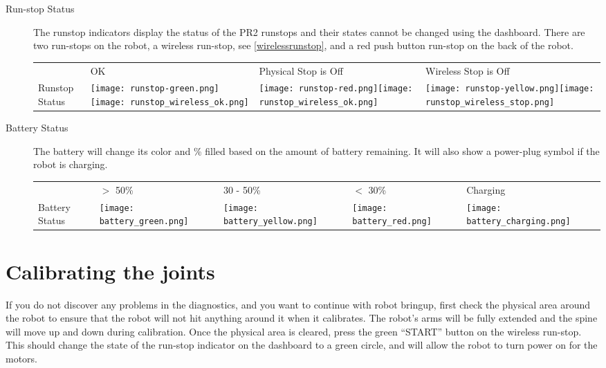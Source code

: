 \begin{description}
\item[Run-stop Status] The runstop indicators display the status of the PR2 runstops and their states cannot be changed using the dashboard. 
There are two run-stops on the robot, a wireless run-stop, see \ref{wirelessrunstop}, and a red push button run-stop on the back of the robot.\\

    \begin{tabular}{m{2.6cm}SSS}
     & OK & Physical Stop is Off & Wireless Stop is Off\\
    Runstop Status & \texttt{[image: runstop-green.png]}\texttt{[image: runstop\_wireless\_ok.png]}&
                     \texttt{[image: runstop-red.png]}\texttt{[image: runstop\_wireless\_ok.png]}&
                     \texttt{[image: runstop-yellow.png]}\texttt{[image: runstop\_wireless\_stop.png]}\\
   \end{tabular}

\item[Battery Status]
The battery will change its color and \% filled based on the amount of battery remaining. It will also show a power-plug symbol if the robot is charging.
                                                                                                                      
    \begin{tabular}{m{2.5cm}SSSS}
     & $>$ 50\% & 30 - 50\% & $<$ 30\% & Charging\\
    Battery Status & \texttt{[image: battery\_green.png]}&
                     \texttt{[image: battery\_yellow.png]}&
                     \texttt{[image: battery\_red.png]}&
                     \texttt{[image: battery\_charging.png]}\\
   \end{tabular}


\end{description}

\section{Calibrating the joints}
If you do not discover any problems in the diagnostics, and you want to continue with robot bringup, first check the physical area around the robot to ensure that the robot will not hit anything around it when it calibrates. The robot's arms will be fully extended and the spine will move up and down during calibration.  Once the physical area is cleared, press the green 
``START'' button on the wireless run-stop.  This should change the state of the run-stop indicator on the dashboard to a green 
circle, and will allow the robot to turn power on for the motors.

